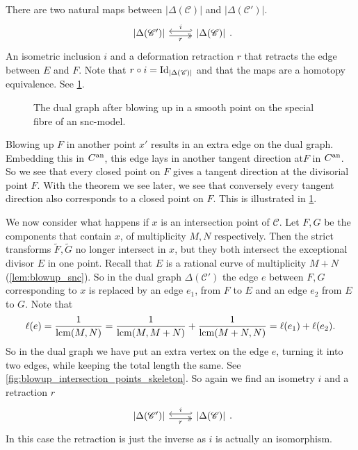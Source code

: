 There are two natural maps between $|\Delta(\mathscr C)|$ and $|\Delta(\mathscr C')|$. 
\[
\begin{tikzcd}
	{|\Delta(\mathscr C')|} \rar[hookleftarrow, shift left]{i} \rar[twoheadrightarrow, shift right, ']{r} & {|\Delta(\mathscr C)|} 
\end{tikzcd}
.\] 
An isometric inclusion $i$ and a deformation retraction $r$ that retracts the edge between  $E$ and $F$. 
Note that $r \circ i = \operatorname{Id}_{|\Delta(\mathscr C)|}$ and that the maps are a homotopy equivalence. 
See \cref{fig:blowup_smooth_point_skeleton}. 

\begin{figure}[ht]
    \centering
    \caption{The dual graph after blowing up in a smooth point on the special fibre of an snc-model. }
    \label{fig:blowup_smooth_point_skeleton}
\end{figure}

\begin{remark}
	Blowing up $ F$ in another point $x'$ results in an extra edge on the dual graph. 
	Embedding this in $C{}^{\text{an}}$, this edge lays in another tangent direction at$F$ in $C{}^{\text{an}}$. 
	So we see that every closed point  on  $F$ gives a tangent direction at the divisorial point $F$. 
	With the theorem we see later, we see that conversely every tangent direction also corresponds to a closed point on $F$. 
	This is illustrated in \cref{fig:blowup_smooth_point_skeleton}.
\end{remark}


\medskip

We now consider what happens if $x$ is an intersection point of $\mathscr C$. 
Let $F, G$ be the components that contain $x$, of multiplicity $M, N$ respectively. 
Then the strict transforms $\tilde F, \tilde G$ no longer intersect in $x$, but they both intersect the exceptional divisor $E$ in one point. 
Recall that $E$ is a rational curve of multiplicity $M + N$ (\cref{lem:blowup_snc}). 
So in the dual graph $\Delta(\mathscr C')$ the edge $e$ between $F, G$ corresponding to $x$ is replaced by an edge $e_1$, from $F$ to $E$ and an edge $e_2$ from $E$ to $G$. 
Note that \[
	\ell(e) = \frac{1}{\operatorname{lcm}(M, N)} = \frac{1}{\operatorname{lcm}(M, M + N)} + \frac{1}{\operatorname{lcm}(M+ N, N)} = \ell(e_1) + \ell(e_2)
.\]  
So in the dual graph we have put an extra vertex on the edge $e$, turning it into two edges, while keeping the total length the same.
See \cref{fig:blowup_intersection_points_skeleton}. 
So again we find an isometry $i$ and a retraction $r$
\[
\begin{tikzcd}
	{|\Delta(\mathscr C')|} \rar[hookleftarrow, shift left]{i} \rar[twoheadrightarrow, shift right, ']{r} & {|\Delta(\mathscr C)|} 
\end{tikzcd}
.\] 
In this case the retraction is just the inverse as $i$ is actually an isomorphism. 

